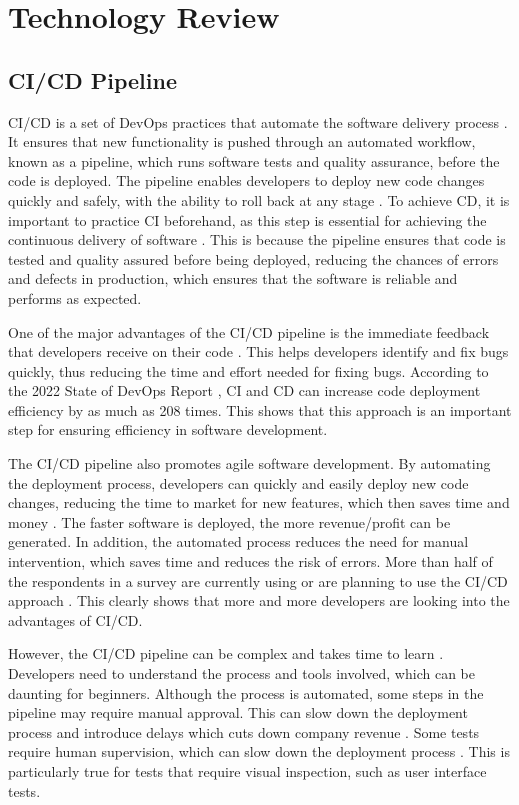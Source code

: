 \chapter{Technology Review}

\section{CI/CD Pipeline}
CI/CD is a set of DevOps practices that automate the software delivery process \cite{saarenpaa2020creating}. It ensures that new functionality is pushed through an automated workflow, known as a pipeline, which runs software tests and quality assurance, before the code is deployed. The pipeline enables developers to deploy new code changes quickly and safely, with the ability to roll back at any stage \cite{bs}. To achieve CD, it is important to practice CI beforehand, as this step is essential for achieving the continuous delivery of software \cite{dsmgm}. This is because the pipeline ensures that code is tested and quality assured before being deployed, reducing the chances of errors and defects in production, which ensures that the software is reliable and performs as expected. 

One of the major advantages of the CI/CD pipeline is the immediate feedback that developers receive on their code \cite{bs}. This helps developers identify and fix bugs quickly, thus reducing the time and effort needed for fixing bugs. According to the 2022 State of DevOps Report \cite{clark}, CI and CD can increase code deployment efficiency by as much as 208 times. This shows that this approach is an important step for ensuring efficiency in software development. 

The CI/CD pipeline also promotes agile software development. By automating the deployment process, developers can quickly and easily deploy new code changes, reducing the time to market for new features, which then saves time and money \cite{bs, phillips2015manager}. The faster software is deployed, the more revenue/profit can be generated. In addition, the automated process reduces the need for manual intervention, which saves time and reduces the risk of errors. More than half of the respondents in a survey are currently using or are planning to use the CI/CD approach \cite{clark}. This clearly shows that more and more developers are looking into the advantages of CI/CD.

However, the CI/CD pipeline can be complex and takes time to learn \cite{sander}. Developers need to understand the process and tools involved, which can be daunting for beginners. Although the process is automated, some steps in the pipeline may require manual approval. This can slow down the deployment process and introduce delays which cuts down company revenue \cite{sb}. Some tests require human supervision, which can slow down the deployment process \cite{laster}. This is particularly true for tests that require visual inspection, such as user interface tests.

